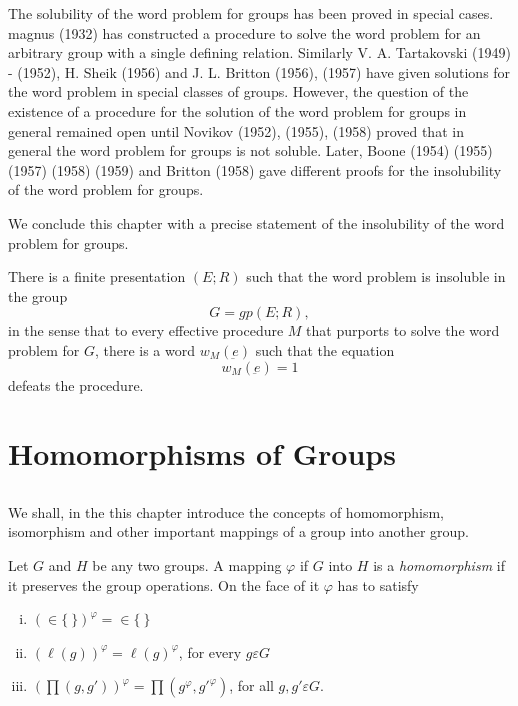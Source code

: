 The solubility of the word problem for groups has been proved in
special cases. magnus (1932) has constructed a procedure to solve the
word problem for an arbitrary group with a single defining
relation. Similarly V. A. Tartakovski (1949) - (1952), H. Sheik (1956)
and J. L. Britton (1956), (1957) have given solutions for the word
problem in special classes of groups. However, the question of the
existence of a procedure for the solution of the word problem for
groups in general remained open until Novikov (1952), (1955), (1958)
proved that in general the word problem for groups is not
soluble. Later, Boone (1954) (1955) (1957) (1958) (1959) and Britton
(1958) gave different proofs for the insolubility of the word problem
for groups. 

We conclude this chapter with a precise statement of the insolubility
of the word problem for groups. 
\begin{theorem} 
  There is a finite presentation $(E ; R)$ such that the word problem
  is insoluble in the group 
  $$
  G = gp(E ; R),
  $$
  in the sense that to every effective procedure $M$ that purports to
  solve the word problem for $G$, there is a word $w_M (\underbar{e})$
  such that the equation 
  $$
  w_M (\underbar{e}) =1
  $$
  defeats the procedure.
\end{theorem}

\chapter{Homomorphisms of Groups} %

\section{}%

We shall, in the this chapter introduce the concepts of homomorphism,
isomorphism and other important mappings of a group into another
group. 

Let $G$ and $H$ be any two groups. A mapping $\varphi$ if $G$ into $H$
is a \textit{homomorphism} if it preserves the group operations. On
the face of it $\varphi$ has to satisfy 
\begin{enumerate}[(i)]
\item $(\in \{ ~ \})^{\varphi} = \in \{ ~ \}$ 
\item $(\ell (g))^{\varphi} = \ell (g)^{\varphi}$, for every $g \varepsilon G$
\item $(\prod (g, g'))^{\varphi} = \prod (g^\varphi,  g{'}^\varphi)$,
  for all $g, g' \varepsilon G$. 
\end{enumerate}

